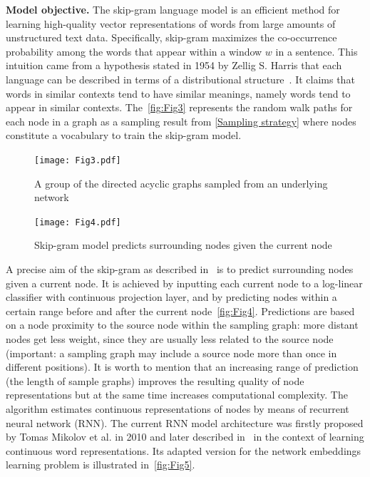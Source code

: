 \textbf{Model objective. }The skip-gram language model is an efficient method for learning high-quality vector representations of words from large amounts of unstructured text data. Specifically, skip-gram maximizes the co-occurrence probability among the words that appear within a window $w$ in a sentence. This intuition came from a hypothesis stated in 1954 by Zellig S. Harris that each language can be described in terms of a distributional structure~\cite{Zellig:DistributionalStructure}. It claims that words in similar contexts tend to have similar meanings, namely words tend to appear in similar contexts.
The~\autoref{fig:Fig3} represents the random walk paths for each node in a graph as a sampling result from \ref{Sampling strategy} where nodes constitute a vocabulary to train the skip-gram model.
\begin{figure}[!hp]
    \centering
    \begin{minipage}{0.45\textwidth}
        \centering
        \texttt{[image: Fig3.pdf]}
        \caption{A group of the directed acyclic graphs sampled from an underlying network}
        \label{fig:Fig3}
    \end{minipage}\hfill
    \begin{minipage}{0.45\textwidth}
        \centering
        \texttt{[image: Fig4.pdf]} 
        \caption{Skip-gram model predicts surrounding nodes given the current node}
        \label{fig:Fig4}
    \end{minipage}
\end{figure}
A precise aim of the skip-gram as described in~\cite{SKIP-GRAM-MODEL} is to predict surrounding nodes given a current node. It is achieved by inputting each current node to a log-linear classifier with continuous projection layer, and by predicting nodes within a certain range before and after the current node~\autoref{fig:Fig4}.
Predictions are based on a node proximity to the source node within the sampling graph: more distant nodes get less weight, since they are usually less related to the source node (important: a sampling graph may include a source node more than once in different positions). It is worth to mention that an increasing range of prediction (the length of sample graphs) improves the resulting quality of node representations but at the same time increases computational complexity.
The algorithm estimates continuous representations of nodes by means of recurrent neural network (RNN). The current RNN model architecture was firstly proposed by Tomas Mikolov et al. in 2010 and later described in~\cite{mikolov2013linguistic} in the context of learning continuous word representations. Its adapted version for the network embeddings learning problem is illustrated in~\autoref{fig:Fig5}.

